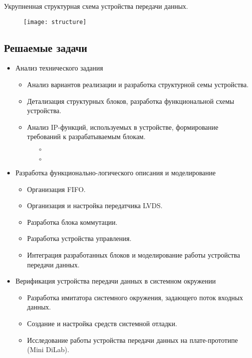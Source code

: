 Укрупненная структурная схема устройства передачи данных.
\begin{figure}[H]
	\centering
	\texttt{[image: structure]}
\end{figure}

\subsection*{Решаемые задачи}

\begin{itemize}

	\item Анализ технического задания
	\begin{itemize}
		\item Анализ вариантов реализации и разработка структурной семы устройства.
		\item Детализация структурных блоков, разработка функциональной схемы устройства.
		\item Анализ IP-функций, используемых в устройстве, формирование требований к разрабатываемым блокам.
			\begin{itemize}
				\item[$\circ$] 
				\item[$\circ$] \\[5mm]
			\end{itemize}
	\end{itemize}
	
	\item Разработка функционально-логического описания и моделирование
	\begin{itemize}
		\item Организация FIFO.
		\item Организация и настройка передатчика LVDS.
		\item Разработка блока коммутации.
		\item Разработка устройства управления.
		\item Интеграция разработанных блоков и моделирование работы устройства передачи данных.
	\end{itemize}
	
	
	\item Верификация устройства передачи данных в системном окружении
	\begin{itemize}
		\item Разработка имитатора системного окружения, задающего поток входных данных.
		\item Создание и настройка средств системной отладки.
		\item Исследование работы устройства передачи данных на плате-прототипе (Mini DiLab).
	\end{itemize}

\end{itemize}

